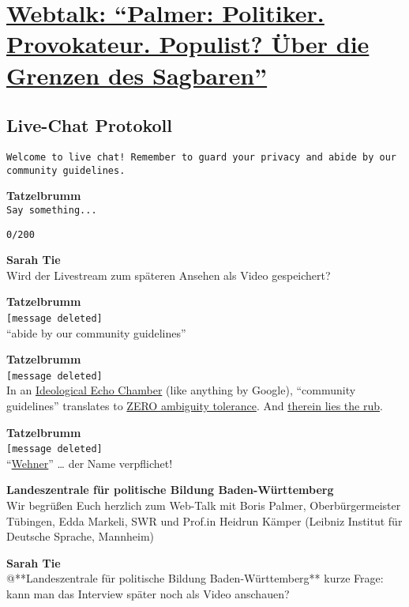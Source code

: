 \documentclass[]{article}
\date{}
\begin{document}
\section{\texorpdfstring{\protect\hyperlink{Webtalk}{Webtalk: ``Palmer:
Politiker. Provokateur. Populist? Über die Grenzen des
Sagbaren''}}{Webtalk: Palmer: Politiker. Provokateur. Populist? Über die Grenzen des Sagbaren}}\label{webtalk-palmer-politiker.-provokateur.-populist-uxfcber-die-grenzen-des-sagbaren}

\subsection{Live-Chat Protokoll}\label{live-chat-protokoll}

\texttt{Welcome\ to\ live\ chat!\ Remember\ to\ guard\ your\ privacy\ and\ abide\ by\ our\ community\ guidelines.}

\textbf{Tatzelbrumm}\\
\texttt{Say\ something...}

\texttt{0/200}

\textbf{Sarah Tie}\\
​Wird der Livestream zum späteren Ansehen als Video gespeichert?

\textbf{Tatzelbrumm}\\
​\texttt{{[}message\ deleted{]}}\\
​``abide by our community guidelines''

\textbf{Tatzelbrumm}\\
​\texttt{{[}message\ deleted{]}}\\
In an \protect\hyperlink{Ideological-Echo-Chamber}{Ideological Echo
Chamber} (like anything by Google), ``community guidelines'' translates
to \protect\hyperlink{ambiguity-tolerance}{ZERO ambiguity tolerance}.
And \protect\hyperlink{therein-lies-the-rub}{therein lies the rub}.

\textbf{Tatzelbrumm}\\
​\texttt{{[}message\ deleted{]}}\\
​``\protect\hyperlink{Wehner}{Wehner}'' \ldots{} der Name verpflichet!

\textbf{Landeszentrale für politische Bildung Baden-Württemberg}\\
​Wir begrüßen Euch herzlich zum Web-Talk mit Boris Palmer,
Oberbürgermeister Tübingen, Edda Markeli, SWR und Prof.in Heidrun Kämper
(Leibniz Institut für Deutsche Sprache, Mannheim)

\textbf{Sarah Tie}\\
​@**Landeszentrale für politische Bildung Baden-Württemberg** kurze
Frage: kann man das Interview später noch als Video anschauen?
\end{document}
